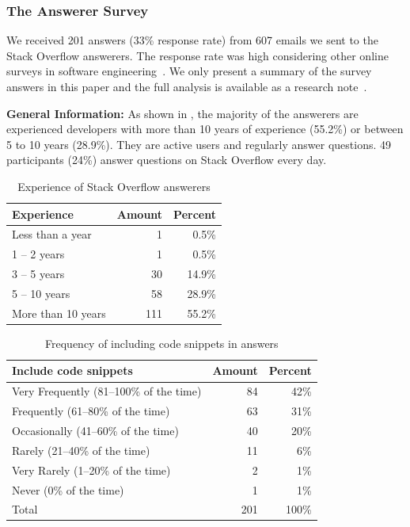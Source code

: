 \documentclass[10pt,journal,compsoc]{IEEEtran}
\begin{document}
\subsubsection{The Answerer Survey}

We received 201 answers (33\% response rate) from 607 emails we sent to the
Stack Overflow answerers. The response rate was high considering other
online surveys in software engineering~\cite{Punter2003}. 
We only present a summary of the survey answers in
this paper and the full analysis is available as a research note~\cite{Ragkhitwetsagul_RN2017}.

\textbf{General Information:} As shown in , the majority of the answerers are experienced
developers with more than 10 years of experience (55.2\%) or between 5 to 10
years (28.9\%). They are active users and regularly answer questions. 49
participants (24\%) answer questions on Stack Overflow every day.

\begin{table}
	\centering
	\caption{Experience of Stack Overflow answerers}
	\label{tab:survey_exp}
	\begin{tabular}{lrr}
		\toprule
		Experience & Amount & Percent \\
		\midrule
		Less than a year & 1 & 0.5\% \\
		1 -- 2 years & 1 & 0.5\% \\
		3 -- 5 years & 30 & 14.9\% \\
		5 -- 10 years & 58 & 28.9\% \\
		More than 10 years	& 111 & 55.2\% \\
		\bottomrule
	\end{tabular}
\end{table}

\begin{table}
	\centering
	\caption{Frequency of including code snippets in answers}
	\label{tab:survey_code_snippet_frequency}
	\begin{tabular}{lrr}
		\toprule
		Include code snippets & Amount & Percent \\
		\midrule
		Very Frequently (81--100\% of the time)	& 84 & 42\% \\
		Frequently (61--80\% of the time) &	63 & 31\% \\
		Occasionally (41--60\% of the time) & 40 & 20\% \\
		Rarely (21--40\% of the time) & 11 & 6\% \\
		Very Rarely (1--20\% of the time) & 2 & 1\% \\
		Never (0\% of the time) & 1 & 1\% \\
		\midrule
		Total & 201 & 100\% \\
		\bottomrule
	\end{tabular}
\end{table}
\end{document}
